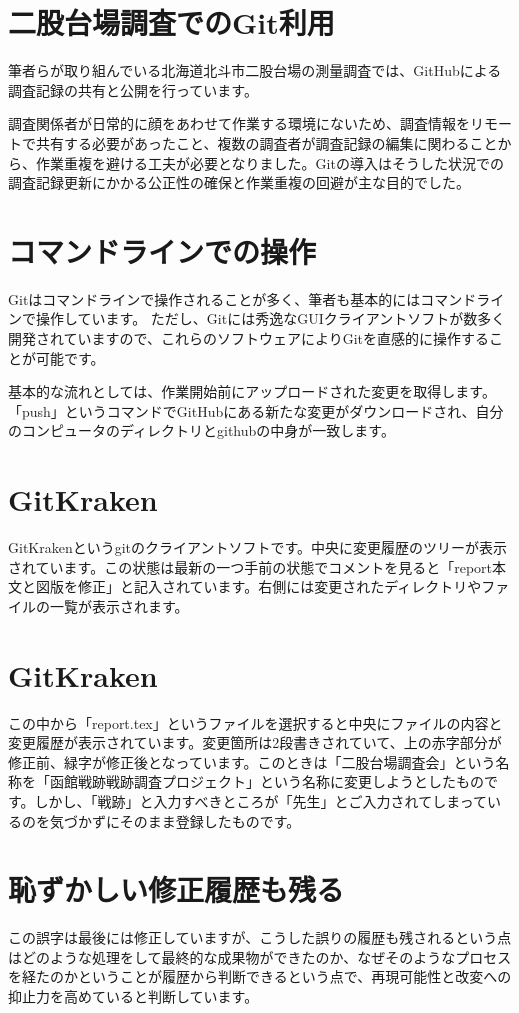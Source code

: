 \documentclass[14Q]{jsarticle}
\begin{document}
\section{二股台場調査でのGit利用}

筆者らが取り組んでいる北海道北斗市二股台場の測量調査では、GitHubによる調査記録の共有と公開を行っています。

調査関係者が日常的に顔をあわせて作業する環境にないため、調査情報をリモートで共有する必要があったこと、複数の調査者が調査記録の編集に関わることから、作業重複を避ける工夫が必要となりました。Gitの導入はそうした状況での調査記録更新にかかる公正性の確保と作業重複の回避が主な目的でした。




\section{コマンドラインでの操作}
Gitはコマンドラインで操作されることが多く、筆者も基本的にはコマンドラインで操作しています。
ただし、Gitには秀逸なGUIクライアントソフトが数多く開発されていますので、これらのソフトウェアによりGitを直感的に操作することが可能です。

基本的な流れとしては、作業開始前にアップロードされた変更を取得します。「push」というコマンドでGitHubにある新たな変更がダウンロードされ、自分のコンピュータのディレクトリとgithubの中身が一致します。

\section{GitKraken}

GitKrakenというgitのクライアントソフトです。中央に変更履歴のツリーが表示されています。この状態は最新の一つ手前の状態でコメントを見ると「report本文と図版を修正」と記入されています。右側には変更されたディレクトリやファイルの一覧が表示されます。

\section{GitKraken}
この中から「report.tex」というファイルを選択すると中央にファイルの内容と変更履歴が表示されています。変更箇所は2段書きされていて、上の赤字部分が修正前、緑字が修正後となっています。このときは「二股台場調査会」という名称を「函館戦跡戦跡調査プロジェクト」という名称に変更しようとしたものです。しかし、「戦跡」と入力すべきところが「先生」とご入力されてしまっているのを気づかずにそのまま登録したものです。

\section{恥ずかしい修正履歴も残る}
この誤字は最後には修正していますが、こうした誤りの履歴も残されるという点はどのような処理をして最終的な成果物ができたのか、なぜそのようなプロセスを経たのかということが履歴から判断できるという点で、再現可能性と改変への抑止力を高めていると判断しています。
\end{document}
